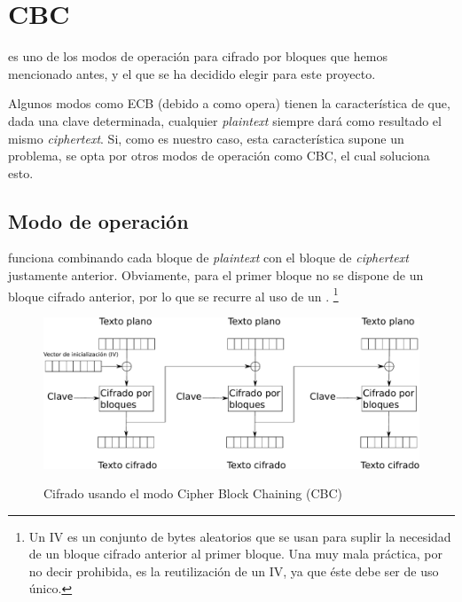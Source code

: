 
 \section{CBC}

  es uno de los modos de operación para cifrado por bloques que hemos mencionado antes,
 y el que se ha decidido elegir para este proyecto.

 Algunos modos como ECB (debido a como opera) tienen la característica de que, dada una clave determinada,
 cualquier \emph{plaintext} siempre dará como resultado el mismo \emph{ciphertext}.
 Si, como es nuestro caso, esta característica supone un problema,
 se opta por otros modos de operación como CBC, el cual soluciona esto. \emph{\parencite{Reference23}}

 \subsection{Modo de operación}

  funciona combinando cada bloque de \emph{plaintext} con el bloque de \emph{ciphertext} justamente anterior.
 Obviamente, para el primer bloque no se dispone de un bloque cifrado anterior,
 por lo que se recurre al uso de un .
 \footnote{Un IV es un conjunto de bytes aleatorios que se usan para suplir la necesidad de un bloque cifrado anterior al primer bloque.
 Una muy mala práctica, por no decir prohibida, es la reutilización de un IV, ya que éste debe ser de uso único.}

 \begin{figure}[ht]
   \centering
   \includegraphics[scale=0.4]{Figures/CBC_enc}
   \decoRule
   \caption[Cipher Block Chaining (CBC) - Cifrado]{Cifrado usando el modo Cipher Block Chaining (CBC)} \emph{\parencite{Reference1}}
   \label{fig:CBC_enc}
 \end{figure}

